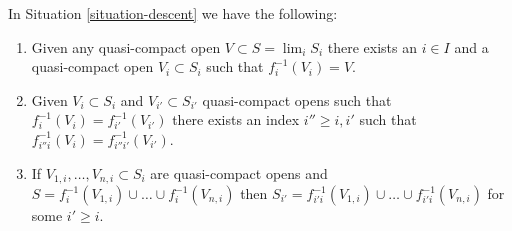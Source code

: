 \begin{lemma}
\label{lemma-descend-opens}
In Situation \ref{situation-descent} we have the following:
\begin{enumerate}
\item Given any quasi-compact open $V \subset S = \lim_i S_i$
there exists an $i \in I$ and a quasi-compact open $V_i \subset S_i$
such that $f_i^{-1}(V_i) = V$.
\item Given $V_i \subset S_i$ and $V_{i'} \subset S_{i'}$
quasi-compact opens such that $f_i^{-1}(V_i) = f_{i'}^{-1}(V_{i'})$
there exists an index $i'' \geq i, i'$ such that
$f_{i''i}^{-1}(V_i) = f_{i''i'}^{-1}(V_{i'})$.
\item If $V_{1, i}, \ldots, V_{n, i} \subset S_i$ are quasi-compact
opens and $S = f_i^{-1}(V_{1, i}) \cup \ldots \cup f_i^{-1}(V_{n, i})$
then $S_{i'} = f_{i'i}^{-1}(V_{1, i}) \cup \ldots \cup f_{i'i}^{-1}(V_{n, i})$
for some $i' \geq i$.
\end{enumerate}
\end{lemma}

